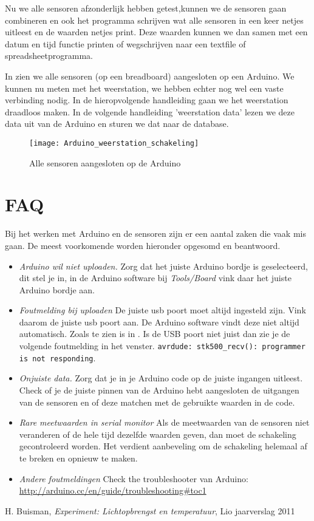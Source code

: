 Nu we alle sensoren afzonderlijk hebben getest,kunnen we de sensoren
gaan combineren en ook het programma schrijven wat alle sensoren in een
keer netjes uitleest en de waarden netjes print. Deze waarden kunnen we
dan samen met een datum en tijd functie printen of wegschrijven naar een
textfile of spreadsheetprogramma.

In  zien we alle sensoren (op
een breadboard) aangesloten op een Arduino. We kunnen nu meten met het weerstation, 
we hebben echter nog wel een vaste verbinding nodig. In de hieropvolgende 
handleiding gaan we het weerstation draadloos maken.  
In de volgende handleiding 'weerstation data' lezen we deze data uit van 
de Arduino en sturen we dat naar de \hisparc database.




\begin{figure}
    \centering
    \texttt{[image: Arduino\_weerstation\_schakeling]}
    \caption{Alle sensoren aangesloten op de Arduino}
   \label{fig:Arduino_weerstation_schakeling}
\end{figure}


\section{FAQ}

Bij het werken met Arduino en de sensoren zijn er een aantal zaken die vaak mis
gaan. De meest voorkomende worden hieronder opgesomd en beantwoord.

\begin{itemize} 
    \item \emph{Arduino wil niet uploaden.} Zorg dat het
    juiste Arduino bordje is geselecteerd, dit stel je in, in de Arduino
    software bij \emph{Tools/Board} vink daar het juiste Arduino bordje aan.
    \item \emph{Foutmelding bij uploaden} De juiste usb poort moet altijd
    ingesteld zijn. Vink daarom de juiste usb poort aan. De Arduino software
    vindt deze niet altijd automatisch. Zoals te zien is in
    . Is de USB poort niet juist dan zie je de
    volgende foutmelding in het venster.
    \verb|avrdude: stk500_recv(): programmer is not responding|.
    \item \emph{Onjuiste data.} Zorg dat je in je Arduino code op de juiste 
    ingangen uitleest. Check of je de juiste pinnen van de Arduino hebt aangesloten
    de uitgangen van de sensoren en of deze matchen met de gebruikte waarden in de
    code.
    \item \emph{Rare meetwaarden in serial
    monitor} Als de meetwaarden van de sensoren niet veranderen of de hele
    tijd dezelfde waarden geven, dan moet de schakeling gecontroleerd
    worden. Het verdient aanbeveling om de schakeling helemaal af te breken
    en opnieuw te maken.
    \item \emph{Andere foutmeldingen} Check the troubleshooter van Arduino: 
    \url{http://arduino.cc/en/guide/troubleshooting#toc1} 
    
\end{itemize}

\begin{thebibliography}{9}
        H. Buisman, \emph{\hisparc Experiment: Lichtopbrengst en temperatuur}, 
        Lio jaarverslag 2011
\end{thebibliography}




